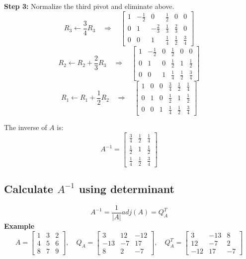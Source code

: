 \documentclass{article}
\begin{document}
\noindent \textbf{Step 3:} Normalize the third pivot and eliminate above.
\[
R_3 \leftarrow \frac{3}{4}R_3 \quad \Rightarrow \quad
\left[\begin{array}{ccc|ccc}
1 & -\frac{1}{2} & 0 & \frac{1}{2} & 0 & 0 \\
0 & 1 & -\frac{2}{3} & \frac{1}{3} & \frac{2}{3} & 0 \\
0 & 0 & 1 & \frac{1}{4} & \frac{1}{2} & \frac{3}{4}
\end{array}\right]
\]
\[
R_2 \leftarrow R_2 + \frac{2}{3}R_3 \quad \Rightarrow \quad
\left[\begin{array}{ccc|ccc}
1 & -\frac{1}{2} & 0 & \frac{1}{2} & 0 & 0 \\
0 & 1 & 0 & \frac{1}{2} & 1 & \frac{1}{2} \\
0 & 0 & 1 & \frac{1}{4} & \frac{1}{2} & \frac{3}{4}
\end{array}\right]
\]
\[
R_1 \leftarrow R_1 + \frac{1}{2}R_2 \quad \Rightarrow \quad
\left[\begin{array}{ccc|ccc}
1 & 0 & 0 & \frac{3}{4} & \frac{1}{2} & \frac{1}{4} \\
0 & 1 & 0 & \frac{1}{2} & 1 & \frac{1}{2} \\
0 & 0 & 1 & \frac{1}{4} & \frac{1}{2} & \frac{3}{4}
\end{array}\right]
\]

\noindent The inverse of \( A \) is:
\[
A^{-1} = \begin{bmatrix}
\frac{3}{4} & \frac{1}{2} & \frac{1}{4} \\
\frac{1}{2} & 1 & \frac{1}{2} \\
\frac{1}{4} & \frac{1}{2} & \frac{3}{4}
\end{bmatrix}
\]
\subsection{Calculate $A^{-1}$ using determinant}
\[
A^{-1} = \frac{1}{|A|} adj(A) = Q^T_A
\]
\textbf{Example}
\[
A = \begin{bmatrix}
        1 & 3 & 2 \\
        4 & 5 & 6 \\
        8 & 7 & 9
\end{bmatrix}, \quad
Q_A = \begin{bmatrix}
        3 & 12 & -12 \\
        -13 & -7 & 17 \\
        8 & 2 & -7
\end{bmatrix}, \quad
Q_A^T = \begin{bmatrix}
        3 & -13 & 8 \\
        12 & -7 & 2 \\
        -12 & 17 & -7
\end{bmatrix}
\]
\end{document}
